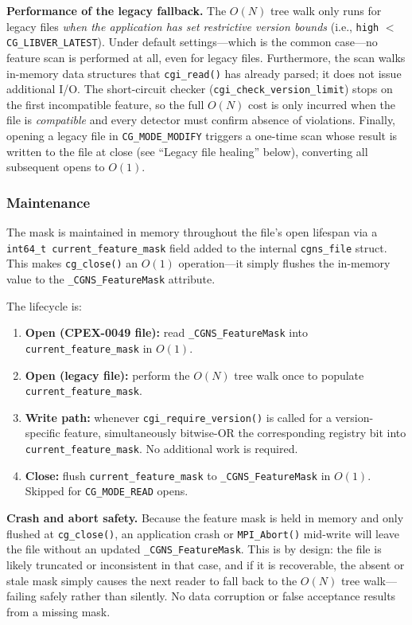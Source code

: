 \documentclass[11pt,letterpaper]{article}
\begin{document}
\textbf{Performance of the legacy fallback.}  The $O(N)$ tree walk
only runs for legacy files \emph{when the application has set
restrictive version bounds} (i.e., \texttt{high} $<$
\texttt{CG\_LIBVER\_LATEST}).  Under default settings---which is the
common case---no feature scan is performed at all, even for legacy
files.  Furthermore, the scan walks in-memory data structures that
\texttt{cgi\_read()} has already parsed; it does not issue additional
I/O.  The short-circuit checker (\texttt{cgi\_check\_version\_limit})
stops on the first incompatible feature, so the full $O(N)$ cost is
only incurred when the file is \emph{compatible} and every detector
must confirm absence of violations.  Finally, opening a legacy file
in \texttt{CG\_MODE\_MODIFY} triggers a one-time scan whose result
is written to the file at close (see ``Legacy file healing'' below),
converting all subsequent opens to $O(1)$.

\subsubsection{Maintenance}

The mask is maintained in memory throughout the file's open lifespan
via a \texttt{int64\_t current\_feature\_mask} field added to the
internal \texttt{cgns\_file} struct.  This makes \texttt{cg\_close()}
an $O(1)$ operation---it simply flushes the in-memory value to the
\texttt{\_CGNS\_FeatureMask} attribute.

The lifecycle is:

\begin{enumerate}[leftmargin=2em]
\item \textbf{Open (CPEX-0049 file):} read \texttt{\_CGNS\_FeatureMask}
  into \texttt{current\_feature\_mask} in $O(1)$.
\item \textbf{Open (legacy file):} perform the $O(N)$ tree walk once
  to populate \texttt{current\_feature\_mask}.
\item \textbf{Write path:} whenever \texttt{cgi\_require\_version()}
  is called for a version-specific feature, simultaneously bitwise-OR
  the corresponding registry bit into \texttt{current\_feature\_mask}.
  No additional work is required.
\item \textbf{Close:} flush \texttt{current\_feature\_mask} to
  \texttt{\_CGNS\_FeatureMask} in $O(1)$.  Skipped for
  \texttt{CG\_MODE\_READ} opens.
\end{enumerate}

\textbf{Crash and abort safety.}  Because the feature mask is held in
memory and only flushed at \texttt{cg\_close()}, an application crash
or \texttt{MPI\_Abort()} mid-write will leave the file without an
updated \texttt{\_CGNS\_FeatureMask}.  This is by design: the file is
likely truncated or inconsistent in that case, and if it is
recoverable, the absent or stale mask simply causes the next reader
to fall back to the $O(N)$ tree walk---failing safely rather than
silently.  No data corruption or false acceptance results from a
missing mask.
\end{document}
